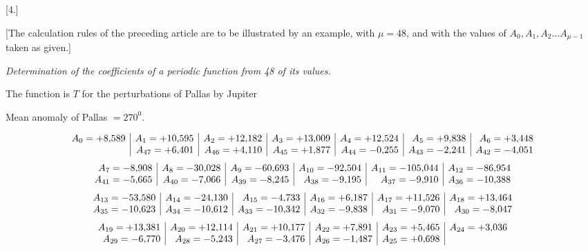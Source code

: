 \clearpage
\begin{landscape}
\begingroup
\fontsize{9.5}{12}\selectfont
{}
\renewcommand{\headrulewidth}{0pt}
\setlength{\lineskip}{4pt}\setlength{\lineskiplimit}{4pt}
\setlength{\arraycolsep}{4pt}
\begin{center}[4.]\end{center}
\par\noindent\hspace*{\parindent}[The calculation rules of the preceding article are to be illustrated by an example, with \(\mu=48\), and with the values of \(A_0, A_1, A_2\ldots A_{\mu-1}\) taken as given.]
\begin{center}
\textit{Determination of the coefficients of a periodic function from 48 of its values.}\par
\medskip
The function is \(T\) for the perturbations of Pallas by Jupiter\par
Mean anomaly of Pallas \(=270^0\).
\end{center}
\[
\begin{array}{@{}r|r|r|r|r|r|r@{}}
A_0=+8{,}589&A_1=+10{,}595&A_2=+12{,}182&A_3=+13{,}009&A_4=+12{,}524&A_5=+9{,}838&A_6=+3{,}448\\
&A_{47}=+6{,}401&A_{46}=+4{,}110&A_{45}=+1{,}877&A_{44}=-0{,}255&A_{43}=-2{,}241&A_{42}=-4{,}051
\end{array}
\]
\[
\begin{array}{@{}r|r|r|r|r|r@{}}
A_7=-8{,}908&A_8=-30{,}028&A_9=-60{,}693&A_{10}=-92{,}504&A_{11}=-105{,}044&A_{12}=-86{,}954\\
A_{41}=-5{,}665&A_{40}=-7{,}066&A_{39}=-8{,}245&A_{38}=-9{,}195&A_{37}=-9{,}910&A_{36}=-10{,}388
\end{array}
\]
\[
\begin{array}{@{}r|r|r|r|r|r@{}}
A_{13}=-53{,}580&A_{14}=-24{,}130&A_{15}=-4{,}733&A_{16}=+6{,}187&A_{17}=+11{,}526&A_{18}=+13{,}464\\
A_{35}=-10{,}623&A_{34}=-10{,}612&A_{33}=-10{,}342&A_{32}=-9{,}838&A_{31}=-9{,}070&A_{30}=-8{,}047
\end{array}
\]
\[
\begin{array}{@{}r|r|r|r|r|r@{}}
A_{19}=+13{,}381&A_{20}=+12{,}114&A_{21}=+10{,}177&A_{22}=+7{,}891&A_{23}=+5{,}465&A_{24}=+3{,}036\\
A_{29}=-6{,}770&A_{28}=-5{,}243&A_{27}=-3{,}476&A_{26}=-1{,}487&A_{25}=+0{,}698&
\end{array}
\]
\end{landscape}
